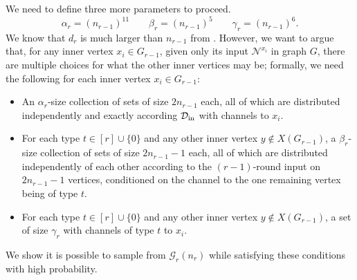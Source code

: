 \documentclass[11pt]{article}
\theoremstyle{definition}
\newcommand{\Nbtogether}[2]{\ensuremath{\mathcal{N}^{#1_{#2}}}}
\newcommand{\cD}{\ensuremath{\mathcal{D}}}
\newcommand{\cG}{\ensuremath{\mathcal{G}}}
\newcommand{\cDmarg}{\ensuremath{\cD_{\textnormal{in}}}}
\begin{document}
We need to define three more parameters to proceed. 
\begin{equation}\label{eq:params-alphabetagamma}
	\alpha_r = (n_{r-1})^{11} \qquad \beta_r = (n_{r-1})^{5}\qquad \gamma_r = (n_{r-1})^6.
\end{equation}
We know that $d_r$ is much larger than $n_{r-1}$ from . However, we want to argue that, for any inner vertex $x_i \in G_{r-1}$, given only its input $\Nbtogether{x}{i}$ in graph $G$, there are multiple choices for what the other inner vertices may be; formally, we need the following for each inner vertex $x_i \in G_{r-1}$:
\begin{itemize}[leftmargin=5pt]
	\item An $\alpha_r$-size collection of sets of size $2n_{r-1}$ each, all of which are distributed independently and exactly according $\cDmarg$ with channels to $x_i$. 
	\item For each type $t \in [r] \cup \{0\}$ and any other inner vertex $y \notin X(G_{r-1})$, a $\beta_r$-size collection of sets of size $2n_{r-1}-1$ each, all of which are distributed  independently of each other according to the $(r-1)$-round input on $2n_{r-1}-1$ vertices, conditioned on the channel to the one remaining vertex being of type $t$.
	\item For each type $t \in [r] \cup \{0\}$ and any other inner vertex $y \notin X(G_{r-1})$, a set of size $\gamma_r$ with channels of  type $t$ to $x_i$. 
\end{itemize}
We show it is possible to sample from $\cG_r(n_r)$ while satisfying these conditions with high probability. 
\end{document}
